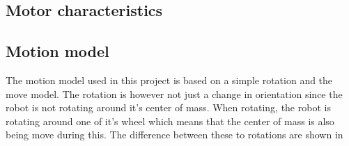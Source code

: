 \documentclass[Main]{subfiles}
\begin{document}

	\subsection{Motor characteristics} %
		\label{sub:motor_characteristics}
		

	\subsection{Motion model} %
		\label{sub:motion_model}
The motion model used in this project is based on a simple rotation and the move model.
The rotation is however not just a change in orientation since the robot is not rotating around it's center of mass.
When rotating, the robot is rotating around one of it's wheel which means that the center of mass is also being move during this.
The difference between these to rotations are shown in
\end{document}
